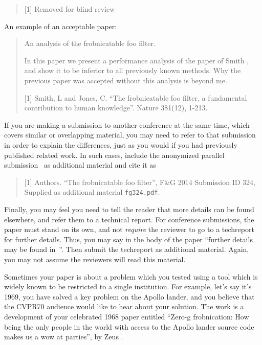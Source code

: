 \documentclass[10pt,twocolumn,letterpaper]{article}
\begin{document}
\begin{CJK}{UTF8}{bkai}
\begin{quote}
         [1] Removed for blind review
   \end{quote}


   An example of an acceptable paper:

   \begin{quote}
      \begin{center}
         An analysis of the frobnicatable foo filter.
      \end{center}

      In this paper we present a performance analysis of the
      paper of Smith \etal [1], and show it to be inferior to
      all previously known methods.  Why the previous paper
      was accepted without this analysis is beyond me.

         [1] Smith, L and Jones, C. ``The frobnicatable foo
      filter, a fundamental contribution to human knowledge''.
      Nature 381(12), 1-213.
   \end{quote}

   If you are making a submission to another conference at the same time,
   which covers similar or overlapping material, you may need to refer to that
   submission in order to explain the differences, just as you would if you
   had previously published related work.  In such cases, include the
   anonymized parallel submission~\cite{Authors14} as additional material and
   cite it as
   \begin{quote}
      [1] Authors. ``The frobnicatable foo filter'', F\&G 2014 Submission ID 324,
      Supplied as additional material {\tt fg324.pdf}.
   \end{quote}

   Finally, you may feel you need to tell the reader that more details can be
   found elsewhere, and refer them to a technical report.  For conference
   submissions, the paper must stand on its own, and not {\em require} the
   reviewer to go to a techreport for further details.  Thus, you may say in
   the body of the paper ``further details may be found
   in~\cite{Authors14b}''.  Then submit the techreport as additional material.
   Again, you may not assume the reviewers will read this material.

   Sometimes your paper is about a problem which you tested using a tool which
   is widely known to be restricted to a single institution.  For example,
   let's say it's 1969, you have solved a key problem on the Apollo lander,
   and you believe that the CVPR70 audience would like to hear about your
   solution.  The work is a development of your celebrated 1968 paper entitled
   ``Zero-g frobnication: How being the only people in the world with access to
   the Apollo lander source code makes us a wow at parties'', by Zeus \etal.


\end{CJK}
\end{document}

